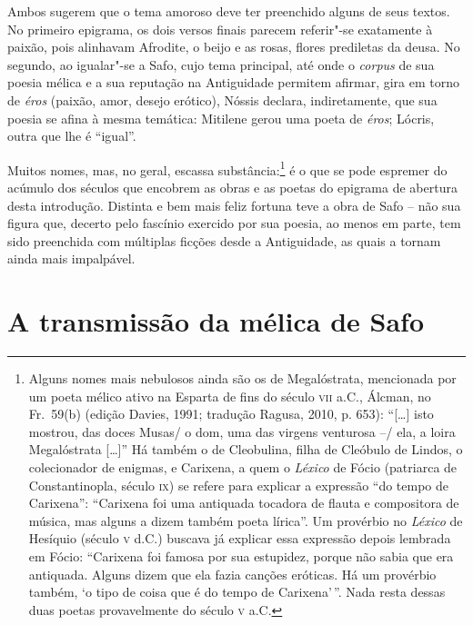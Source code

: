 Ambos sugerem que o tema amoroso deve ter preenchido alguns de seus textos. No
primeiro epigrama, os dois versos finais parecem referir"-se exatamente à
paixão, pois alinhavam Afrodite, o beijo e as rosas, flores prediletas da
deusa. No segundo, ao igualar"-se a Safo, cujo tema principal, até onde o
\textit{corpus} de sua poesia mélica e a sua reputação na Antiguidade permitem
afirmar, gira em torno de \textit{éros} (paixão, amor, desejo erótico), Nóssis
declara, indiretamente, que sua poesia se afina à mesma temática: Mitilene
gerou uma poeta de \textit{éros}; Lócris, outra que lhe é ``igual”.

Muitos nomes, mas, no geral, escassa substância:\footnote{Alguns nomes mais nebulosos ainda são
os de Megalóstrata, mencionada por um poeta mélico ativo na Esparta de fins do
século \textsc{vii} a.C., Álcman, no Fr.~59(b) (edição Davies, 1991;
tradução Ragusa, 2010, p. 653): ``[\ldots{}] isto mostrou, das doces
Musas/ o dom, uma das virgens venturosa --/ ela, a loira Megalóstrata [\ldots{}]'' Há
também o de Cleobulina, filha de Cleóbulo de Lindos, o colecionador de enigmas,
e Carixena, a quem o \textit{Léxico} de Fócio (patriarca de Constantinopla,
século \textsc{ix}) se refere para explicar a expressão ``do tempo de Carixena”:
``Carixena foi uma antiquada tocadora de flauta e compositora de música,
mas alguns a dizem também poeta lírica”. Um provérbio no \textit{Léxico} de
Hesíquio (século \textsc{v} d.C.) buscava já explicar essa expressão depois lembrada em
Fócio: ``Carixena foi famosa por sua estupidez, porque não sabia que era
antiquada. Alguns dizem que ela fazia canções eróticas. Há um provérbio também,
‘o tipo de coisa que é do tempo de Carixena’\,”. Nada resta dessas duas poetas
provavelmente do século \textsc{v} a.C.} é o que se pode espremer do acúmulo dos
séculos que encobrem as obras e as poetas do epigrama de abertura desta
introdução. Distinta e bem mais feliz fortuna teve a obra de Safo -- não sua
figura que, decerto pelo fascínio exercido por sua poesia, ao menos em parte,
tem sido preenchida com múltiplas ficções desde a Antiguidade, as quais a
tornam ainda mais impalpável. 

\section*{A transmissão da mélica de Safo}

